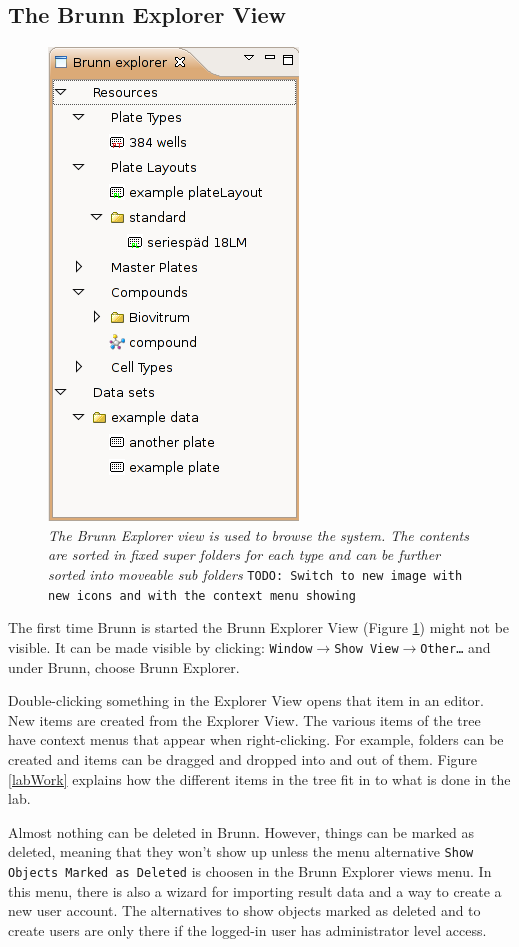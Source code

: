 \documentclass[a4paper,10pt]{article}
\begin{document}
         \subsection{The Brunn Explorer View} 
            \begin{figure}
                \begin{center}
                    \includegraphics[width=.2\textwidth]
                                    {images/explorerView.png}
                \end{center}
                \caption{\textit{The Brunn Explorer view is used to browse the
                    system. The contents are sorted in fixed super folders for
                    each type and can be further sorted into moveable sub
                    folders } \texttt{TODO: Switch to new image with new icons
                    and with the context menu showing}}
                \label{explorerView}
            \end{figure}

            \noindent
            The first time Brunn is started the Brunn Explorer View (Figure
            \ref{explorerView}) might not be visible. It can be made visible by
            clicking: \texttt{Window$\rightarrow$Show
            View$\rightarrow$Other\ldots} and under Brunn, choose Brunn
            Explorer. 

            Double-clicking something in the Explorer View opens that item in
            an editor. New items are created from the Explorer View. The
            various items of the tree have context menus that appear when
            right-clicking. For example, folders can be created and items can be
            dragged and dropped into and out of them. Figure \ref{labWork}
            explains how the different items in the tree fit in to what is done
            in the lab.  

            Almost nothing can be deleted in Brunn. However, things can be
            marked as deleted, meaning that they won't show up unless the menu
            alternative \texttt{Show Objects Marked as Deleted} is choosen in
            the Brunn Explorer views menu. In this menu, there is also a wizard
            for importing result data and a way to create a new user account.
            The alternatives to show objects marked as deleted and to create
            users are only there if the logged-in user has administrator
            level access.
        
\end{document}
